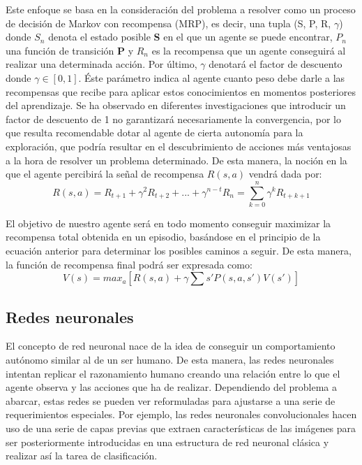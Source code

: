 \documentclass[11pt,spanish,listoffigures,listoftables]{tfgetsinf}
\begin{document}
Este enfoque se basa en la consideración del problema a resolver como un proceso de decisión de Markov con recompensa (MRP), es decir, una tupla (S, P, R, $\gamma$) donde $S_{n}$ denota el estado posible \textbf{S}  en el que un agente se puede encontrar, $P_{n}$ una función de transición \textbf{P} y $R_{n}$ es la recompensa que un agente conseguirá al realizar una determinada acción. Por último, $\gamma$ denotará el factor de descuento donde $\gamma \in [0,1]$. Éste parámetro indica al agente cuanto peso debe darle a las recompensas que recibe para aplicar estos conocimientos en momentos posteriores del aprendizaje. Se ha observado en diferentes investigaciones que introducir un factor de descuento de 1 no garantizará necesariamente la convergencia, por lo que resulta recomendable dotar al agente de cierta autonomía para la exploración, que podría resultar en el descubrimiento de acciones más ventajosas a la hora de resolver un problema determinado. De esta manera, la noción en la que el agente percibirá la señal de recompensa \textbf{$R(s,a)$} vendrá dada por:
\[R(s,a) = R_{t+1} + \gamma^{2}R_{t+2} + ... + \gamma^{n-t}R_{n} = \displaystyle\sum_{k=0}^{n} \gamma^{k} R_{t+k+1} \]

El objetivo de nuestro agente será en todo momento conseguir maximizar la recompensa total obtenida en un episodio, basándose en el principio de la ecuación anterior para determinar los posibles caminos a seguir. De esta manera, la función de recompensa final podrá ser expresada como:  \[V(s) = max_{a}[R(s,a) + \gamma \sum{s'}P(s,a,s') V(s')]\]



\subsection{Redes neuronales}

El concepto de red neuronal nace de la idea de conseguir un comportamiento autónomo similar al de un ser humano. De esta manera, las redes neuronales intentan replicar el razonamiento humano creando una relación entre lo que el agente observa y las acciones que ha de realizar. Dependiendo del problema a abarcar, estas redes se pueden ver reformuladas para ajustarse a una serie de requerimientos especiales. Por ejemplo, las redes neuronales convolucionales hacen uso de una serie de capas previas que extraen características de las imágenes para ser posteriormente introducidas en una estructura de red neuronal clásica y realizar así la tarea de clasificación.
\end{document}
